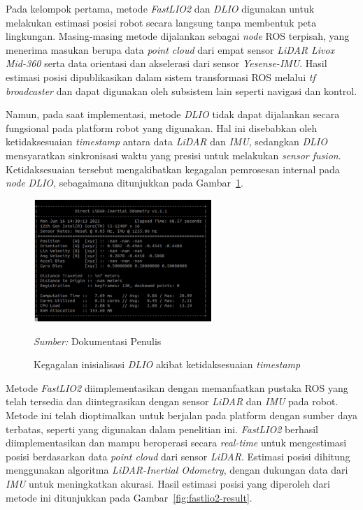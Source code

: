Pada kelompok pertama, metode \emph{FastLIO2} dan \emph{DLIO} digunakan untuk melakukan estimasi posisi robot secara langsung tanpa membentuk peta lingkungan. Masing-masing metode dijalankan sebagai \emph{node} ROS terpisah, yang menerima masukan berupa data \emph{point cloud} dari empat sensor \emph{LiDAR Livox Mid-360} serta data orientasi dan akselerasi dari sensor \emph{Yesense-IMU}. Hasil estimasi posisi dipublikasikan dalam sistem transformasi ROS melalui \emph{tf broadcaster} dan dapat digunakan oleh subsistem lain seperti navigasi dan kontrol.

Namun, pada saat implementasi, metode \emph{DLIO} tidak dapat dijalankan secara fungsional pada platform robot yang digunakan. Hal ini disebabkan oleh ketidaksesuaian \emph{timestamp} antara data \emph{LiDAR} dan \emph{IMU}, sedangkan \emph{DLIO} mensyaratkan sinkronisasi waktu yang presisi untuk melakukan \emph{sensor fusion}. Ketidaksesuaian tersebut mengakibatkan kegagalan pemrosesan internal pada \emph{node} \emph{DLIO}, sebagaimana ditunjukkan pada Gambar~\ref{fig:dlio-error}.

\begin{figure}[H]
  \centering
  \includegraphics[width=0.6\textwidth]{gambar/bab3/dlio-error.png}
  \caption{Kegagalan inisialisasi \emph{DLIO} akibat ketidaksesuaian \emph{timestamp}} 
  \label{fig:dlio-error}
  \footnotesize{\emph{Sumber:} Dokumentasi Penulis}
\end{figure}

Metode \emph{FastLIO2} diimplementasikan dengan memanfaatkan pustaka ROS yang telah tersedia dan diintegrasikan dengan sensor \emph{LiDAR} dan \emph{IMU} pada robot. Metode ini telah dioptimalkan untuk berjalan pada platform dengan sumber daya terbatas, seperti yang digunakan dalam penelitian ini. \emph{FastLIO2} berhasil diimplementasikan dan mampu beroperasi secara \emph{real-time} untuk mengestimasi posisi berdasarkan data \emph{point cloud} dari sensor \emph{LiDAR}. Estimasi posisi dihitung menggunakan algoritma \emph{LiDAR-Inertial Odometry}, dengan dukungan data dari \emph{IMU} untuk meningkatkan akurasi. Hasil estimasi posisi yang diperoleh dari metode ini ditunjukkan pada Gambar~\ref{fig:fastlio2-result}.

